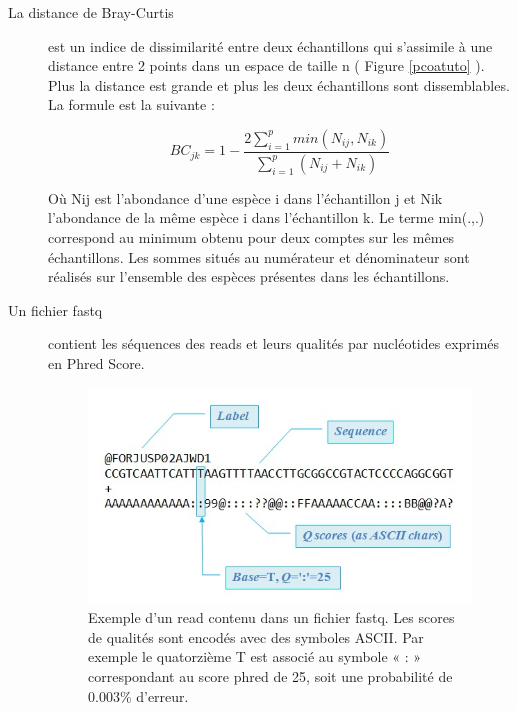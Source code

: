 \documentclass[12pt,a4paper]{article}
\begin{document}
\begin{description}
\item[La distance de Bray-Curtis] est un indice de dissimilarité entre deux échantillons qui s'assimile à une distance entre 2 points dans un espace de taille n ( Figure \ref{pcoatuto} ). Plus la distance est grande et plus les deux échantillons sont dissemblables. La formule est la suivante : 

\begin{mycapequ}[!h]
   \begin{equation}
    BC_{jk} = 1 - \frac{2\sum_{i=1}^{p}min(N_{ij},N_{ik})}{\sum_{i=1}^{p}(N_{ij} + N_{ik})} 
   \end{equation}
      \caption{Où Nij est l'abondance d'une  espèce i dans l'échantillon j et Nik l'abondance de la même espèce i dans l'échantillon k. Le terme min(.,.) correspond au minimum obtenu pour deux comptes sur les mêmes échantillons. Les sommes situés au numérateur et dénominateur sont réalisés sur l'ensemble des espèces présentes dans les échantillons.}
\end{mycapequ}


\item[Un fichier fastq] contient les séquences des reads et leurs qualités par nucléotides exprimés en Phred Score.

\begin{figure}[!h]
\begin{center}
\includegraphics[scale=0.6]{img/fastq.jpg}\hfill
\end{center}
\caption{Exemple d'un read contenu dans un fichier fastq. Les scores de qualités sont encodés avec des symboles ASCII. Par exemple le quatorzième T  est associé au symbole « : » correspondant au score phred de 25, soit une probabilité de 0.003\% d'erreur.  }
\label{fastq}
\end{figure}

\end{description}
\end{document}
